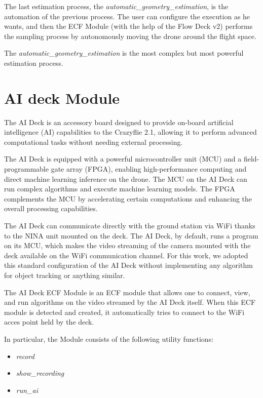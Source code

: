 The last estimation process, the \textit{automatic\_geometry\_estimation}, is the automation of the previous process. 
The user can configure the execution as he wants, and then the ECF Module (with the help of the Flow Deck v2) performs the sampling process by autonomously moving the drone around the flight space.

The \textit{automatic\_geometry\_estimation} is the most complex but most powerful estimation process.
\pagebreak%

\section{AI deck Module}\label{sec:module_ai_deck}


The AI Deck is an accessory board designed to provide on-board artificial intelligence (AI) capabilities to the Crazyflie 2.1, allowing it to perform advanced computational tasks without needing external processing.

The AI Deck is equipped with a powerful microcontroller unit (MCU) and a field-programmable gate array (FPGA), enabling high-performance computing and direct machine learning inference on the drone.
The MCU on the AI Deck can run complex algorithms and execute machine learning models. 
The FPGA complements the MCU by accelerating certain computations and enhancing the overall processing capabilities.

The AI Deck can communicate directly with the ground station via WiFi thanks to the NINA unit mounted on the deck.
The AI Deck, by default, runs a program on its MCU, which makes the video streaming of the camera mounted with the deck available on the WiFi communication channel.
For this work, we adopted this standard configuration of the AI Deck without implementing any algorithm for object tracking or anything similar.

The AI Deck ECF Module is an ECF module that allows one to connect, view, and run algorithms on the video streamed by the AI Deck itself.
When this ECF module is detected and created, it automatically tries to connect to the WiFi acces point held by the deck.

In particular, the Module consists of the following utility functions:
\begin{itemize}
    \item \textit{record}
    \item \textit{show\_recording}
    \item \textit{run\_ai}
\end{itemize}

